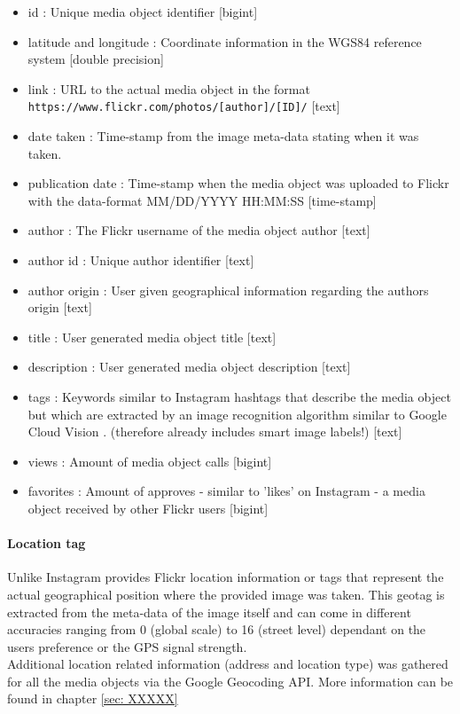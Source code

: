 \begin{itemize}
    \item id : Unique media object identifier [bigint]
    \item latitude and longitude : Coordinate information in the WGS84 reference system [double precision]
    \item link : URL to the actual media object in the format \texttt{https://www.flickr.com/photos/[author]/[ID]/} [text]
    \item date taken : Time-stamp from the image meta-data stating when it was taken. 
    \item publication date : Time-stamp when the media object was uploaded to Flickr with the data-format MM/DD/YYYY HH:MM:SS [time-stamp]
    \item author : The Flickr username of the media object author [text]
    \item author id : Unique author identifier [text] 
    \item author origin : User given geographical information regarding the authors origin [text]
    \item title : User generated media object title [text]
    \item description : User generated media object description [text]
    \item tags : Keywords similar to Instagram hashtags that describe the media object but which are extracted by an image recognition algorithm similar to Google Cloud Vision \cite{Flickr2019FlickrRecognition}. (therefore already includes smart image labels!) [text]
    \item views : Amount of media object calls [bigint]
    \item favorites : Amount of approves - similar to 'likes' on Instagram - a media object received by other Flickr users [bigint]
\end{itemize}

\paragraph{Location tag}
Unlike Instagram provides Flickr location information or tags that represent the actual geographical position where the provided image was taken. This geotag is extracted from the meta-data of the image itself and can come in different accuracies ranging from 0 (global scale) to 16 (street level) dependant on the users preference or the GPS signal strength. \\
Additional location related information (address and location type) was gathered for all the media objects via the Google Geocoding API. More information can be found in chapter \ref{sec: XXXXX}

